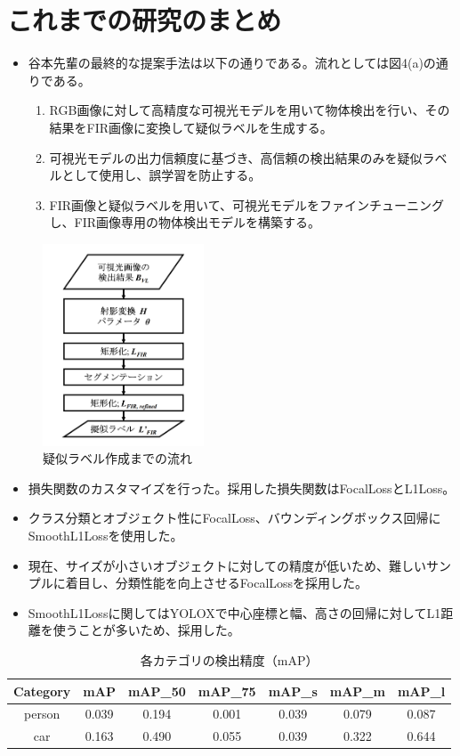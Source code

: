 \documentclass[a4j]{jarticle}
\begin{document}
	\section{これまでの研究のまとめ}
	\begin{itemize}
		\item 谷本先輩の最終的な提案手法は以下の通りである。流れとしては図4(a)の通りである。
		\begin{enumerate}
			\item RGB画像に対して高精度な可視光モデルを用いて物体検出を行い、その結果をFIR画像に変換して疑似ラベルを生成する。
			\item 可視光モデルの出力信頼度に基づき、高信頼の検出結果のみを疑似ラベルとして使用し、誤学習を防止する。
			\item FIR画像と疑似ラベルを用いて、可視光モデルをファインチューニングし、FIR画像専用の物体検出モデルを構築する。
		\end{enumerate}
	\end{itemize}
	\begin{figure}[H]
		\centering%
		\includegraphics[height=6cm]{fig/疑似ラベル生成の流れ.png}
		\hspace{1cm}%
		\caption{疑似ラベル作成までの流れ}
		\label{fig:Research summary}%
	\end{figure}
	\begin{itemize}
		\item 損失関数のカスタマイズを行った。採用した損失関数はFocalLossとL1Loss。
		\item クラス分類とオブジェクト性にFocalLoss、バウンディングボックス回帰にSmoothL1Lossを使用した。
		\item 現在、サイズが小さいオブジェクトに対しての精度が低いため、難しいサンプルに着目し、分類性能を向上させるFocalLossを採用した。
		\item SmoothL1Lossに関してはYOLOXで中心座標と幅、高さの回帰に対してL1距離を使うことが多いため、採用した。
	\end{itemize}
	\begin{table}[htbp]
		\centering
		\begin{tabular}{|c|c|c|c|c|c|c|}
			\hline
			\textbf{Category} & \textbf{mAP} & \textbf{mAP\_50} & \textbf{mAP\_75} & \textbf{mAP\_s} & \textbf{mAP\_m} & \textbf{mAP\_l} \\
			\hline
			person & 0.039 & 0.194 & 0.001 & 0.039 & 0.079 & 0.087 \\
			car    & 0.163 & 0.490 & 0.055 & 0.039 & 0.322 & 0.644 \\
			\hline
		\end{tabular}
		\caption{各カテゴリの検出精度（mAP）}
	\end{table}
\end{document}
